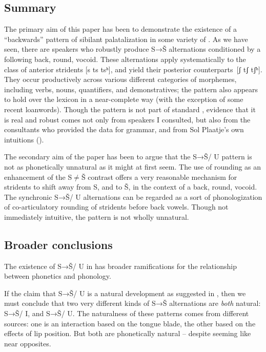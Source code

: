 \documentclass[output=paper,newtxmath,modfonts,nonflat,hidelinks]{langsci/langscibook}
\begin{document}
\subsection{Summary}\label{sec:bennett:5.1}

The primary aim of this paper has been to demonstrate the existence of a ``backwards'' pattern of sibilant palatalization in some variety of . As we have seen, there are speakers who robustly produce S→Š alternations conditioned by a following back, round, vocoid. These alternations apply systematically to the class of anterior stridents [s ts tsʰ], and yield their posterior counterparts\linebreak\ [ʃ tʃ tʃʰ]. They occur productively across various different categories of morphemes, including verbs, nouns, quantifiers, and demonstratives; the pattern also appears to hold over the lexicon in a near-complete way (with the exception of some recent loanwords). Though the pattern is not part of standard , evidence that it is real and robust comes not only from speakers I consulted, but also from the consultants who provided the data for  grammar, and from Sol Plaatje’s own intuitions (\citealt{Jones&Plaatje1916}).

The secondary aim of the paper has been to argue that the S→Š/ {\longrule} U pattern is not as phonetically unnatural as it might at first seem. The use of rounding as an enhancement of the S${\neq}$Š contrast offers a very reasonable mechanism for stridents to shift away from S, and to Š, in the context of a back, round, vocoid. The synchronic S→Š/ {\longrule} U alternations can be regarded as a sort of phonologization of co-articulatory rounding of stridents before back vowels. Though not immediately intuitive, the pattern is not wholly unnatural.

\subsection{Broader conclusions}\label{sec:bennett:5.2}

The existence of S→Š/ {\longrule} U in  has broader ramifications for the relationship between phonetics and phonology. 

If the claim that S→Š/ {\longrule} U is a natural development as suggested in , then we must conclude that two very different kinds of S→Š alternations are \textit{both} natural: S→Š/ {\longrule} I, and S→Š/ {\longrule} U. The naturalness of these patterns comes from different sources: one is an interaction based on the tongue blade, the other based on the effects of lip position. But both are phonetically natural – despite seeming like near opposites. 
\end{document}
